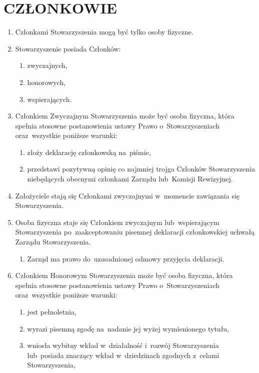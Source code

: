 \documentclass{article}
\begin{document}
\section{CZŁONKOWIE}
  \begin{enumerate}
    \item Członkami Stowarzyszenia mogą być tylko osoby fizyczne.
    \item Stowarzyszenie posiada Członków:
      \begin{enumerate}
        \item zwyczajnych,
        \item honorowych,
        \item wspierających.
      \end{enumerate}
    \item Członkiem Zwyczajnym Stowarzyszenia może być osoba fizyczna, która spełnia stosowne postanowienia ustawy Prawo o~Stowarzyszeniach oraz~wszystkie poniższe warunki:
      \begin{enumerate}
        \item złoży deklarację członkowską na~piśmie,
        \item przedstawi pozytywną opinię co najmniej trojga Członków Stowarzyszenia niebędących obecnymi członkami Zarządu lub~Komisji Rewizyjnej.
      \end{enumerate}
    \item Założyciele stają się Członkami zwyczajnymi w~momencie zawiązania się Stowarzyszenia.
    \item Osoba fizyczna staje się Członkiem zwyczajnym lub~wspierającym Stowarzyszenia po~zaakceptowaniu pisemnej deklaracji członkowskiej uchwałą Zarządu Stowarzyszenia.
      \begin{enumerate}
        \item Zarząd ma prawo do~uzasadnionej odmowy przyjęcia deklaracji.
      \end{enumerate}
    \item Członkiem Honorowym Stowarzyszenia może być osoba fizyczna, która spełnia stosowne postanowienia ustawy Prawo o~Stowarzyszeniach oraz~wszystkie poniższe warunki:
      \begin{enumerate}
        \item jest pełnoletnia,
        \item wyrazi pisemną zgodę na~nadanie jej wyżej wymienionego tytułu,
        \item wniosła wybitny wkład w~działalność i~rozwój Stowarzyszenia lub~posiada znaczący wkład w~dziedzinach zgodnych z~celami Stowarzyszenia,

\end{enumerate}
\end{enumerate}
\end{document}
